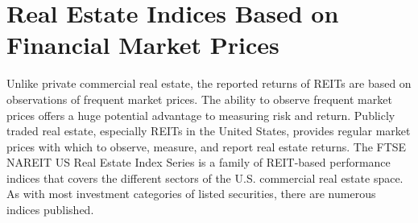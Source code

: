 \documentclass[11pt]{article}
\begin{document}
\section*{Real Estate Indices Based on Financial Market Prices}
Unlike private commercial real estate, the reported returns of REITs are based on observations of frequent market prices. The ability to observe frequent market prices offers a huge potential advantage to measuring risk and return. Publicly traded real estate, especially REITs in the United States, provides regular market prices with which to observe, measure, and report real estate returns. The FTSE NAREIT US Real Estate Index Series is a family of REIT-based performance indices that covers the different sectors of the U.S. commercial real estate space. As with most investment categories of listed securities, there are numerous indices published.
\end{document}
